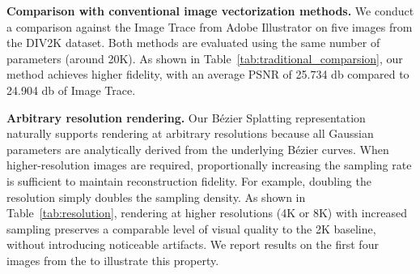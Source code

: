 \begin{table}[h]
\centering
\caption{A quantitative comparison between Adobe Image Trace \cite{illustrator2025} and our method across different images.}
\label{tab:traditional_comparsion}
\end{table}


\noindent\textbf{Comparison with conventional image vectorization methods.}  We conduct a comparison against the Image Trace from Adobe Illustrator \cite{illustrator2025} on five images from the DIV2K dataset. Both methods are evaluated using the same number of parameters (around 20K). As shown in Table~\ref{tab:traditional_comparsion}, our method achieves higher fidelity, with an average PSNR of 25.734 db compared to 24.904 db of Image Trace.

\noindent\textbf{Arbitrary resolution rendering.}  
Our Bézier Splatting representation naturally supports rendering at arbitrary resolutions because all Gaussian parameters are analytically derived from the underlying Bézier curves. When higher-resolution images are required, proportionally increasing the sampling rate is sufficient to maintain reconstruction fidelity. For example, doubling the resolution simply doubles the sampling density. As shown in Table~\ref{tab:resolution}, rendering at higher resolutions (4K or 8K) with increased sampling preserves a comparable level of visual quality to the 2K baseline, without introducing noticeable artifacts. We report results on the first four images from the \cite{Timofte_2017_CVPR_Workshops} to illustrate this property.

